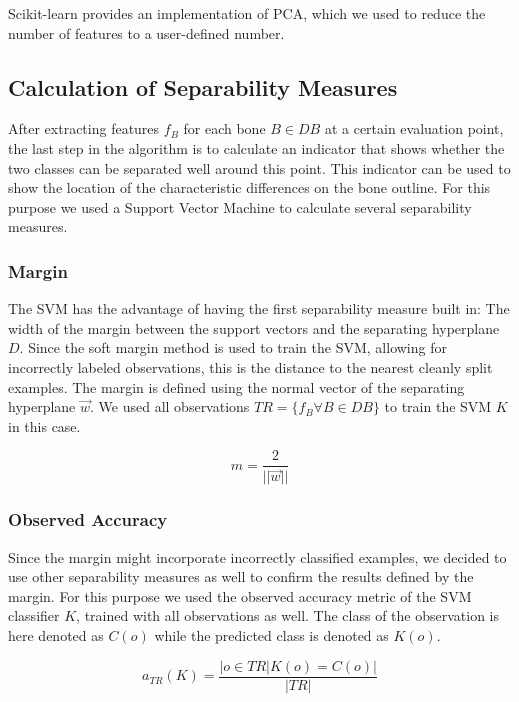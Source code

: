 \documentclass[pdftex,12pt,a4paper]{report}
\begin{document}
Scikit-learn \cite{pedregosa2011scikit} provides an implementation of PCA, which we used to reduce the number of features to a user-defined number.

\subsection{Calculation of Separability Measures}

After extracting features $f_B$ for each bone $B \in DB$ at a certain evaluation point, the last step in the
algorithm is to calculate an indicator that shows whether the two classes can be separated well around this point.
This indicator can be used to show the location of the characteristic differences on the bone outline. For this
purpose we used a Support Vector Machine to calculate several separability measures.

\subsubsection{Margin}

The SVM has the advantage of having the first separability measure built in: The width of the margin between the
support vectors and the separating hyperplane $D$. Since the soft margin method is used to train the SVM, allowing for incorrectly labeled observations, this is the distance to the nearest cleanly split examples. The margin is 
defined using the normal vector of the separating hyperplane $\vec{w}$. We used all observations $TR = \{ f_B \forall B \in DB \}$ to train the SVM $K$ in this case.

\begin{equation}
m = \frac{2}{||\vec{w}||}
\end{equation}

\subsubsection{Observed Accuracy}

Since the margin might incorporate incorrectly classified examples, we decided to use other separability measures
as well to confirm the results defined by the margin. For this purpose we used the observed accuracy metric of the SVM classifier $K$, trained with all observations as well. The class of the observation is here denoted as $C(o)$
while the predicted class is denoted as $K(o)$.

\begin{equation}
a_{TR}(K) = \frac{|o \in TR | K(o) = C(o)|}{|TR|}
\end{equation}
\end{document}

